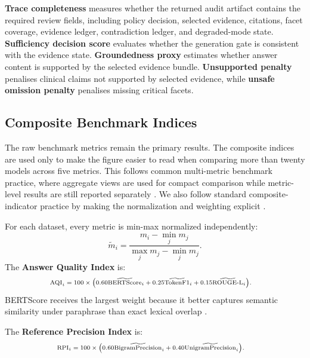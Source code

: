 \documentclass[conference]{IEEEtran}
\begin{document}
\textbf{Trace completeness} measures whether the returned audit artifact contains the required review fields, including policy decision, selected evidence, citations, facet coverage, evidence ledger, contradiction ledger, and degraded-mode state. \textbf{Sufficiency decision score} evaluates whether the generation gate is consistent with the evidence state. \textbf{Groundedness proxy} estimates whether answer content is supported by the selected evidence bundle. \textbf{Unsupported penalty} penalises clinical claims not supported by selected evidence, while \textbf{unsafe omission penalty} penalises missing critical facets.


\subsection{Composite Benchmark Indices}
\label{app:composite-benchmark-indices}

The raw benchmark metrics remain the primary results. The composite indices are used only to make the figure easier to read when comparing more than twenty models across five metrics. This follows common multi-metric benchmark practice, where aggregate views are used for compact comparison while metric-level results are still reported separately \cite{wang2018glue,wang2019superglue,liang2023holistic,muennighoff2023mteb}. We also follow standard composite-indicator practice by making the normalization and weighting explicit \cite{nardo2008handbook}.

For each dataset, every metric is min-max normalized independently:
\[
\tilde{m}_{i}
=
\frac{m_i - \min_j m_j}{\max_j m_j - \min_j m_j}.
\]
The \textbf{Answer Quality Index} is:
\begin{equation}
\scriptsize
\begin{aligned}
\mathrm{AQI}_i = 100 \times \Big( &0.60 \widetilde{\mathrm{BERTScore}}_i + 0.25 \widetilde{\mathrm{TokenF1}}_i + 0.15 \widetilde{\mathrm{ROUGE\text{-}L}}_i \Big).
\end{aligned}
\end{equation}
BERTScore receives the largest weight because it better captures semantic similarity under paraphrase than exact lexical overlap \cite{bertscore}.

The \textbf{Reference Precision Index} is:
\begin{equation}
\scriptsize
\begin{aligned}
\mathrm{RPI}_i = 100 \times \Big( &0.60 \widetilde{\mathrm{BigramPrecision}}_i + 0.40 \widetilde{\mathrm{UnigramPrecision}}_i \Big).
\end{aligned}
\end{equation}
\end{document}
